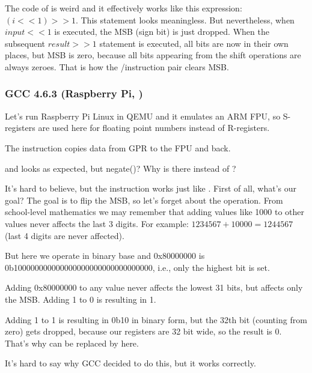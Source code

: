 The code of  is weird and it effectively works like this expression: $(i<<1)>>1$.
This statement looks meaningless.
But nevertheless, when $input<<1$ is executed, the \ac{MSB} (sign bit) is just dropped.
When the subsequent $result>>1$ statement is executed, all bits are now in their own places,
but \ac{MSB} is zero, because all  bits appearing from the shift operations are always zeroes.
That is how the \LSLS/\LSRS instruction pair clears \ac{MSB}.

\subsubsection{\Optimizing GCC 4.6.3 (Raspberry Pi, \ARMMode)}



Let's run Raspberry Pi Linux in QEMU and it emulates an ARM FPU, so S-registers are used here for floating point
numbers instead of R-registers.


The \FMRS instruction copies data from \ac{GPR} to the FPU and back.

 and  looks as expected, but negate()?
Why is there \ADD instead of \XOR?

It's hard to believe, but the instruction 
 works just like .
First of all, what's our goal?
The goal is to flip the \ac{MSB}, so let's forget about the \XOR operation.
From school-level mathematics we may remember that adding values like 1000 to other values never affects
the last 3 digits.
For example: $1234567 + 10000 = 1244567$ (last 4 digits are never affected).

But here we operate in binary base and 0x80000000 is 0b100000000000000000000000000000000, i.e., only the highest bit is set.

Adding 0x80000000 to any value never affects the lowest 31 bits, but affects only the \ac{MSB}.
Adding 1 to 0 is resulting in 1.

Adding 1 to 1 is resulting in 0b10 in binary form, but the 32th bit (counting from zero) gets dropped, 
because our registers are 32 bit wide, so the result is 0.
That's why \XOR can be replaced by \ADD here.

It's hard to say why GCC decided to do this, but it works correctly.
